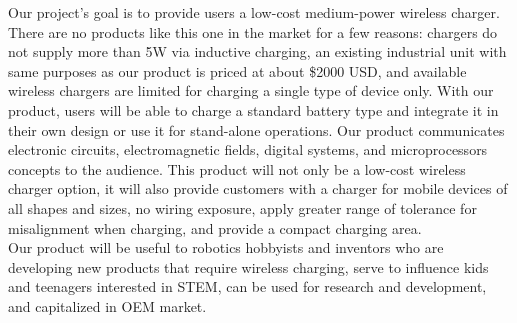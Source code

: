 \documentclass[12pt]{article}
\begin{document}
\indent
Our project’s goal is to provide users a low-cost medium-power wireless charger. There are no products like this one in the market for a few reasons: chargers do not supply more than 5W via inductive charging, an existing industrial unit with same purposes as our product is priced at about \$2000 USD, and available wireless chargers are limited for charging a single type of device only. With our product, users will be able to charge a standard battery type and integrate it in their own design or use it for stand-alone operations. Our product communicates electronic circuits, electromagnetic fields, digital systems, and microprocessors concepts to the audience. This product will not only be a low-cost wireless charger option, it will also provide customers with a charger for mobile devices of all shapes and sizes, no wiring exposure, apply greater range of tolerance for misalignment when charging, and provide a compact charging area. \\

\indent
Our product will be useful to robotics hobbyists and inventors who are developing new products that require wireless charging, serve to influence kids and teenagers interested in STEM, can be used for research and development, and capitalized in OEM market.
\end{document}
